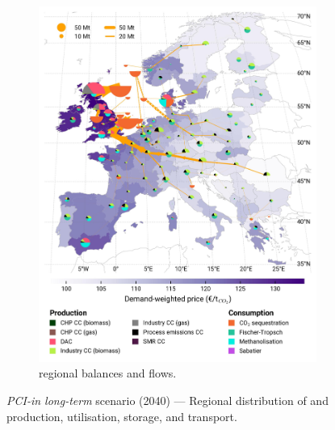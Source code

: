 \documentclass[preprint,12pt,sort&compress]{elsarticle}
\begin{document}
\begin{figure}[htbp]
\begin{subfigure}[t]{0.49\textwidth}
      \includegraphics[width=1\textwidth]{maps/pcipmi-national-international-expansion/base_s_adm___2050-balance_map_co2_stored} 
      \vspace{-0.7cm}
      \caption{ regional balances and flows.}
      \label{fig:PCI-in_lt_2040_co2}
  \end{subfigure}
  \caption{\textit{PCI-in long-term} scenario (2040) --- Regional distribution of  and  production, utilisation, storage, and transport.}
  \label{fig:PCI-in_lt_2040}
\end{figure}
\end{document}
